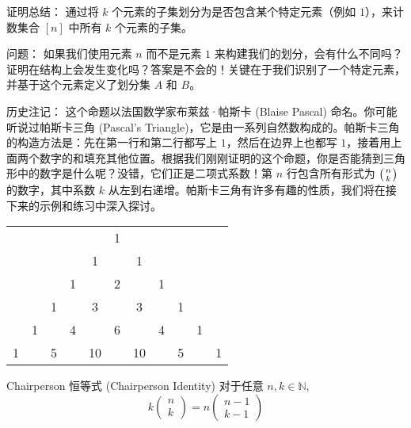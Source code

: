 \begin{questions}{证明总结：}
    通过将 $k$ 个元素的子集划分为是否包含某个特定元素（例如 $1$），来计数集合 $[n]$ 中所有 $k$ 个元素的子集。
\end{questions}

\begin{questions}{问题：}
    如果我们使用元素 $n$ 而不是元素 $1$ 来构建我们的划分，会有什么不同吗？证明在结构上会发生变化吗？答案是不会的！关键在于我们识别了一个特定元素，并基于这个元素定义了划分集 $A$ 和 $B$。
\end{questions}

\begin{questions}{历史注记：}
    这个命题以法国数学家布莱兹·帕斯卡 (Blaise Pascal) 命名。你可能听说过帕斯卡三角 (Pascal's Triangle)，它是由一系列自然数构成的。帕斯卡三角的构造方法是：先在第一行和第二行都写上 $1$，然后在边界上也都写 $1$，接着用上面两个数字的和填充其他位置。根据我们刚刚证明的这个命题，你是否能猜到三角形中的数字是什么呢？没错，它们正是二项式系数！第 $n$ 行包含所有形式为 $\big({n \atop k}\big)$ 的数字，其中系数 $k$ 从左到右递增。帕斯卡三角有许多有趣的性质，我们将在接下来的示例和练习中深入探讨。

    \begin{center}
        \Large\begin{tabular}{ccccccccccc}
              &   &   &   &    & 1 &    &   &   &   &   \\
              &   &   &   & 1  &   & 1  &   &   &   &   \\
              &   &   & 1 &    & 2 &    & 1 &   &   &   \\
              &   & 1 &   & 3  &   & 3  &   & 1 &   &   \\
              & 1 &   & 4 &    & 6 &    & 4 &   & 1 &   \\
            1 &   & 5 &   & 10 &   & 10 &   & 5 &   & 1 \\
        \end{tabular}
    \end{center}
\end{questions}

\begin{proposition}{Chairperson 恒等式 (Chairperson Identity)}
    对于任意 $n,k \in \mathbb{N}$,
    \[k\begin{pmatrix}n\\k\end{pmatrix}=n\begin{pmatrix}n-1\\k-1\end{pmatrix}\]
\end{proposition}


